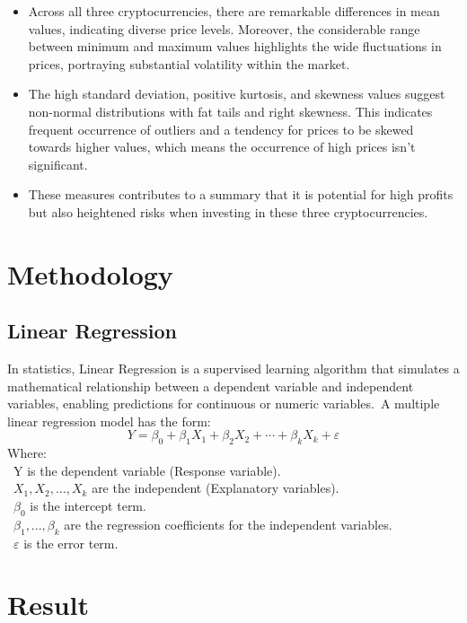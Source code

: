 \documentclass{ieeeojies}
\begin{document}
\begin{itemize}
    \item Across all three cryptocurrencies, there are remarkable differences in mean values, indicating diverse price levels. Moreover, the considerable range between minimum and maximum values highlights the wide fluctuations in prices, portraying substantial volatility within the market.
    \item The high standard deviation, positive kurtosis, and skewness values suggest non-normal distributions with fat tails and right skewness. This indicates frequent occurrence of outliers and a tendency for prices to be skewed towards higher values, which means the occurrence of high prices isn't significant.
    \item These measures contributes to a summary that it is potential for high profits but also heightened risks when investing in these three cryptocurrencies.

\end{itemize}

\section{Methodology}
\subsection{Linear Regression}
In statistics, Linear Regression is a supervised learning algorithm that simulates a mathematical relationship between a dependent variable and independent
variables, enabling predictions for continuous or numeric variables.\
A multiple linear regression model has the form:
\[Y=\beta_0+\beta_1X_1+\beta_2X_2+\cdots+\beta_kX_k+\varepsilon\]
Where:\\
\indent\textbullet\ Y is the dependent variable (Response variable).\\
\indent\textbullet\ \(X_1, X_2, \ldots, X_k\) are the independent (Explanatory variables).\\
\indent\textbullet\ \(\beta_0\) is the intercept term.\\
\indent\textbullet\ \(\beta_1,..., \beta_k\) are the regression coefficients for the independent variables.\\
\indent\textbullet\ \(\varepsilon\) is the error term.
\section{Result}
\end{document}
